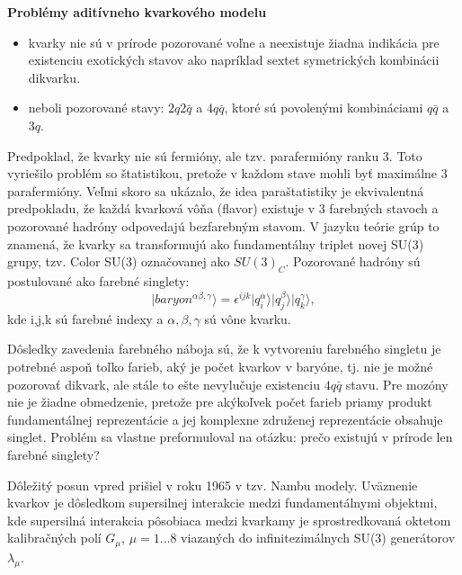 \documentclass[../../main.tex]{subfiles}
\begin{document}
\textbf{Problémy aditívneho kvarkového modelu}
\begin{itemize}
\item kvarky nie sú v prírode pozorované voľne a neexistuje žiadna indikácia pre existenciu exotických stavov ako napríklad sextet symetrických kombinácii dikvarku.
\item neboli pozorované stavy: $2q2\bar{q}$ a $4q\bar{q}$, ktoré sú povolenými kombináciami $q\bar{q}$ a $3q$. 
\end{itemize}
Predpoklad, že kvarky nie sú fermióny, ale tzv. parafermióny ranku 3. Toto vyriešilo problém so štatistikou, pretože v každom stave mohli byť maximálne 3 parafermióny. Veľmi skoro sa ukázalo, že idea paraštatistiky je ekvivalentná predpokladu, že každá kvarková vôňa (flavor) existuje v 3 farebných stavoch a pozorované hadróny odpovedajú bezfarebným stavom. V jazyku teórie grúp to znamená, že kvarky sa transformujú ako fundamentálny triplet novej SU(3) grupy, tzv. Color SU(3) označovanej ako $SU(3)_C$. Pozorované hadróny sú postulované ako farebné singlety:
$$ \vert baryon^{\alpha \beta, \gamma} \rangle = \epsilon^{ijk} \vert q_i^{\alpha} \rangle \vert q_j^{\beta} \rangle \vert q_k^{\gamma} \rangle,$$
kde i,j,k sú farebné indexy a $\alpha, \beta, \gamma$ sú vône kvarku.

Dôsledky zavedenia farebného náboja sú, že k vytvoreniu farebného singletu je potrebné aspoň toľko farieb, aký je počet kvarkov v baryóne, tj. nie je možné pozorovať dikvark, ale stále to ešte nevylučuje existenciu $4q\bar{q}$ stavu. Pre mozóny nie je žiadne obmedzenie, pretože pre akýkoľvek počet farieb priamy produkt fundamentálnej reprezentácie a jej komplexne združenej reprezentácie obsahuje singlet. Problém sa vlastne preformuloval na otázku: prečo existujú v prírode len farebné singlety? 

Dôležitý posun vpred prišiel v roku 1965 v tzv. Nambu modely. Uväznenie kvarkov je dôsledkom supersilnej interakcie medzi fundamentálnymi objektmi, kde supersilná interakcia pôsobiaca medzi kvarkamy je sprostredkovaná oktetom kalibračných polí $G_{\mu}$, $\mu = 1 ... 8$ viazaných do infinitezimálnych SU(3) generátorov $\lambda_{\mu}$.\newline
\end{document}
